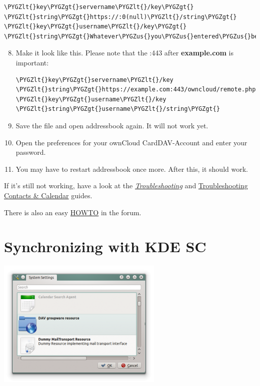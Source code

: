 \documentclass[letterpaper,10pt,english]{sphinxmanual}
\def\PYGZus{\char`\_}
\def\PYGZlt{\char`\<}
\def\PYGZgt{\char`\>}
\begin{document}
\begin{Verbatim}[commandchars=\\\{\}]
\PYGZlt{}key\PYGZgt{}servername\PYGZlt{}/key\PYGZgt{} \PYGZlt{}string\PYGZgt{}https://:0(null)\PYGZlt{}/string\PYGZgt{} \PYGZlt{}key\PYGZgt{}username\PYGZlt{}/key\PYGZgt{} \PYGZlt{}string\PYGZgt{}Whatever\PYGZus{}you\PYGZus{}entered\PYGZus{}before\PYGZlt{}/string\PYGZgt{}
\end{Verbatim}
\begin{enumerate}
\setcounter{enumi}{7}
\item {} 
Make it look like this. Please note that the :443 after \textbf{example.com} is important:

\begin{Verbatim}[commandchars=\\\{\}]
\PYGZlt{}key\PYGZgt{}servername\PYGZlt{}/key \PYGZlt{}string\PYGZgt{}https://example.com:443/owncloud/remote.php/dav/principals/users/USERNAME\PYGZlt{}/string\PYGZgt{} \PYGZlt{}key\PYGZgt{}username\PYGZlt{}/key \PYGZlt{}string\PYGZgt{}username\PYGZlt{}/string\PYGZgt{}
\end{Verbatim}

\item {} 
Save the file and open addressbook again. It will not work yet.

\item {} 
Open the preferences for your ownCloud CardDAV-Account and enter your password.

\item {} 
You may have to restart addressbook once more. After this, it should work.

\end{enumerate}

If it's still not working, have a look at the {\hyperref[pim/troubleshooting::doc]{\emph{Troubleshooting}}} and
\href{https://doc.owncloud.org/server/9.0/admin\_manual/issues/index.html\#troubleshooting-contacts-calendar}{Troubleshooting Contacts \& Calendar} guides.

There is also an easy \href{https://forum.owncloud.org/viewtopic.php?f=3\&t=132}{HOWTO} in the forum.


\section{Synchronizing with KDE SC}
\label{pim/sync_kde:synchronizing-with-kde-sc}\label{pim/sync_kde::doc}
\includegraphics{kdes1.png}
\end{document}
